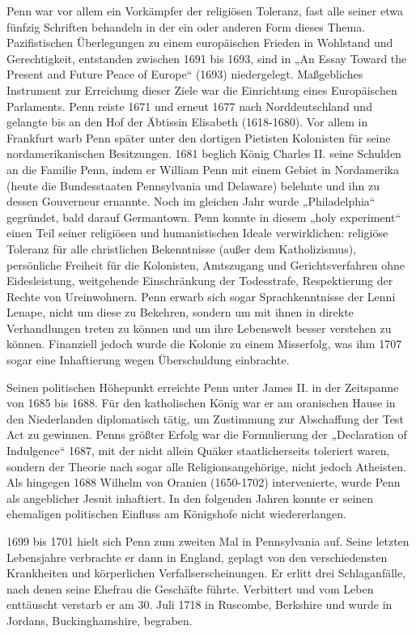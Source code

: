 \medskip 

Penn war vor allem ein Vorkämpfer der religiösen Toleranz, fast alle seiner etwa fünfzig Schriften behandeln in der ein oder anderen Form dieses Thema. Pazifistischen Überlegungen zu einem europäischen Frieden in Wohlstand und Gerechtigkeit, entstanden zwischen 1691 bis 1693, sind in „An Essay Toward the Present and Future Peace of Europe“ (1693) niedergelegt. Maßgebliches Instrument zur Erreichung dieser Ziele war die Einrichtung eines Europäischen Parlaments. Penn reiste 1671 und erneut 1677 nach Norddeutschland und gelangte bis an den Hof der Äbtissin Elisabeth (1618-1680). Vor allem in Frankfurt warb Penn später unter den dortigen Pietisten Kolonisten für seine nordamerikanischen Besitzungen. 1681 beglich König Charles II. seine Schulden an die Familie Penn, indem er William Penn mit einem Gebiet in Nordamerika (heute die Bundesstaaten Pennsylvania und Delaware) belehnte und ihn zu dessen Gouverneur ernannte. Noch im gleichen Jahr wurde „Philadelphia“ gegründet, bald darauf Germantown. Penn konnte in diesem „holy experiment“ einen Teil seiner religiösen und humanistischen Ideale verwirklichen: religiöse Toleranz für alle christlichen Bekenntnisse (außer dem Katholizismus), persönliche Freiheit für die Kolonisten, Amtszugang und Gerichtsverfahren ohne Eidesleistung, weitgehende Einschränkung der Todesstrafe, Respektierung der Rechte von Ureinwohnern. Penn erwarb sich sogar Sprachkenntnisse der Lenni Lenape, nicht um diese zu Bekehren, sondern um mit ihnen in direkte Verhandlungen treten zu können und um ihre Lebenswelt besser verstehen zu können. Finanziell jedoch wurde die Kolonie zu einem Misserfolg, was ihm 1707 sogar eine Inhaftierung wegen Überschuldung einbrachte.

\medskip 

Seinen politischen Höhepunkt erreichte Penn unter James II. in der Zeitspanne von 1685 bis 1688. Für den katholischen König war er am oranischen Hause in den Niederlanden diplomatisch tätig, um Zustimmung zur Abschaffung der Test Act zu gewinnen. Penns größter Erfolg war die Formulierung der „Declaration of Indulgence“ 1687, mit der nicht allein Quäker staatlicherseits toleriert waren, sondern der Theorie nach sogar alle Religionsangehörige, nicht jedoch Atheisten. Als hingegen 1688 Wilhelm von Oranien (1650-1702) intervenierte, wurde Penn als angeblicher Jesuit inhaftiert. In den folgenden Jahren konnte er seinen ehemaligen politischen Einfluss am Königshofe nicht wiedererlangen.

\medskip 

1699 bis 1701 hielt sich Penn zum zweiten Mal in Pennsylvania auf. Seine letzten Lebensjahre verbrachte er dann in England, geplagt von den verschiedensten Krankheiten und körperlichen Verfallserscheinungen. Er erlitt drei Schlaganfälle, nach denen seine Ehefrau die Geschäfte führte. Verbittert und vom Leben enttäuscht verstarb er am 30. Juli 1718 in Ruscombe, Berkshire und wurde in Jordans, Buckinghamshire, begraben.




